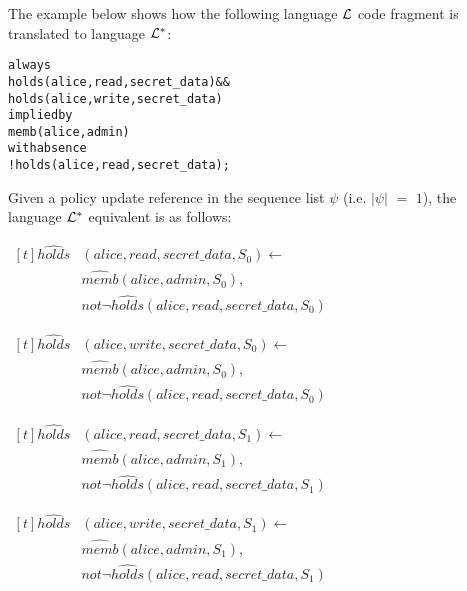 \documentclass[11pt, twocolumn]{article}
\newenvironment{vquote}
  {\begin{list}{}{\leftmargin 1em}\item[]}
  {\end{list}}
\newenvironment{vverbose}
  {\begin{alltt}}
  {\vspace{-\baselineskip}\end{alltt}}
\begin{document}
          The example below shows how the following language ${\cal L}$ code
          fragment is translated to language ${\cal L}^{*}$:

          \begin{vverbose}
always
  holds(alice, read, secret_data) &&
  holds(alice, write, secret_data)
implied by
  memb(alice, admin)
with absence
  !holds(alice, read, secret_data);
          \end{vverbose}

          Given a policy update reference in the sequence list $\psi$ (i.e.
          $|\psi|$ $=$ $1$), the language ${\cal L}^{*}$ equivalent is as
          follows:

          \begin{vquote}
            \begin{math}
              \begin{aligned}[t]
                \hat{holds}&(alice, read, secret\_data, S_{0}) \leftarrow \\
                 & \hat{memb}(alice, admin, S_{0}), \\
                 & not \lnot \hat{holds}(alice, read, secret\_data, S_{0})
              \end{aligned}
            \end{math}

            \begin{math}
              \begin{aligned}[t]
                \hat{holds}&(alice, write, secret\_data, S_{0}) \leftarrow \\
                 & \hat{memb}(alice, admin, S_{0}), \\
                 & not \lnot \hat{holds}(alice, read, secret\_data, S_{0})
              \end{aligned}
            \end{math}

            \begin{math}
              \begin{aligned}[t]
                \hat{holds}&(alice, read, secret\_data, S_{1}) \leftarrow \\
                 & \hat{memb}(alice, admin, S_{1}), \\
                 & not \lnot \hat{holds}(alice, read, secret\_data, S_{1})
              \end{aligned}
            \end{math}

            \begin{math}
              \begin{aligned}[t]
                \hat{holds}&(alice, write, secret\_data, S_{1}) \leftarrow \\
                 & \hat{memb}(alice, admin, S_{1}), \\
                 & not \lnot \hat{holds}(alice, read, secret\_data, S_{1})
              \end{aligned}
            \end{math}
          \end{vquote}
\end{document}
